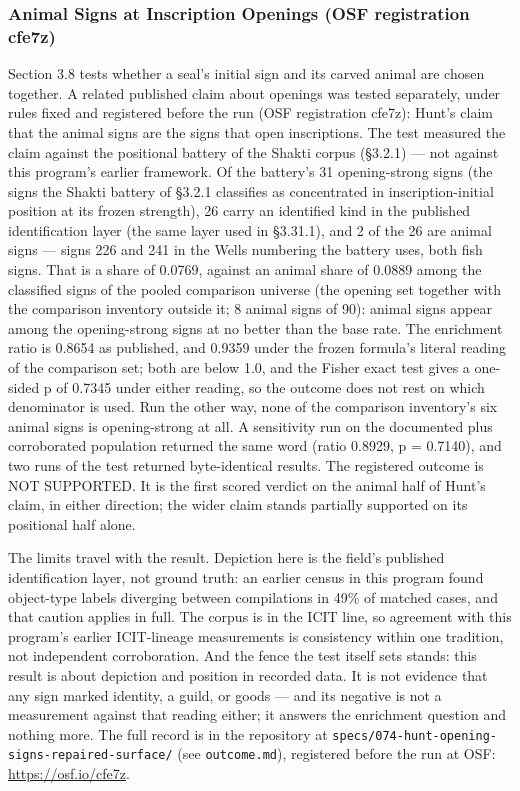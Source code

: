 \documentclass[11pt]{article}
\newcounter{none} %
\begin{document}
\subsubsection{Animal Signs at Inscription Openings
(OSF registration cfe7z)}\label{animal-signs-at-inscription-openings-spec-074}

Section 3.8 tests whether a seal's initial sign and its carved
animal are chosen together. A related published claim about
openings was tested separately, under rules fixed and
registered before the run (OSF registration cfe7z): Hunt's claim that the animal signs are
the signs that open inscriptions. The test measured the claim
against the positional battery of the Shakti corpus (§3.2.1)
--- not against this program's earlier framework. Of the battery's 31 opening-strong signs (the signs the Shakti battery of §3.2.1 classifies as concentrated in inscription-initial position at its frozen strength), 26 carry an identified kind in the published identification layer (the same layer used in §3.31.1), and 2 of the 26 are animal signs
--- signs 226 and 241 in the Wells numbering the battery uses,
both fish signs. That is a share of 0.0769, against an animal share of 0.0889 among the classified signs of the pooled comparison universe (the opening set together with the comparison inventory outside it; 8 animal signs of 90): animal signs appear among the opening-strong signs at
no better than the base rate. The enrichment ratio is 0.8654 as
published, and 0.9359 under the frozen formula's literal
reading of the comparison set; both are below 1.0, and the
Fisher exact test gives a one-sided p of 0.7345 under either
reading, so the outcome does not rest on which denominator is
used. Run the other way, none of the comparison inventory's six
animal signs is opening-strong at all. A sensitivity run on the
documented plus corroborated population returned the same word
(ratio 0.8929, p = 0.7140), and two runs of the test returned
byte-identical results. The registered outcome is NOT
SUPPORTED. It is the first scored verdict on the animal half of
Hunt's claim, in either direction; the wider claim stands
partially supported on its positional half alone.

The limits travel with the result. Depiction here is the
field's published identification layer, not ground truth: an earlier census in this program found object-type
labels diverging between compilations in 49\% of matched cases,
and that caution applies in full. The corpus is in the ICIT
line, so agreement with this program's earlier ICIT-lineage
measurements is consistency within one tradition, not
independent corroboration. And the fence the test itself sets
stands: this result is about depiction and position in recorded
data. It is not evidence that any sign marked identity, a
guild, or goods --- and its negative is not a measurement
against that reading either; it answers the enrichment question
and nothing more. The full record is in the repository at
\texttt{specs/074-hunt-opening-signs-repaired-surface/} (see
\texttt{outcome.md}), registered before the run at OSF:
\url{https://osf.io/cfe7z}.
\end{document}
